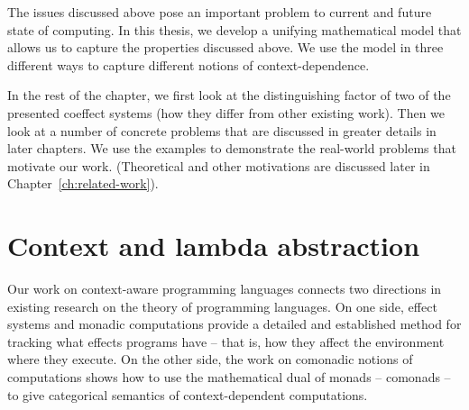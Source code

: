 The issues discussed above pose an important problem to current and future state of computing.
In this thesis, we develop a unifying mathematical model that allows us to capture the properties
discussed above. We use the model in three different ways to capture different notions of 
context-dependence.

In the rest of the chapter, we first look at the distinguishing factor of two of the presented
coeffect systems (how they differ from other existing work). Then we look at a number of concrete 
problems that are discussed in greater details in later chapters. We use the examples to demonstrate 
the real-world problems that motivate our work. (Theoretical and other motivations are discussed 
later in Chapter~\ref{ch:related-work}).


\section{Context and lambda abstraction}

Our work on context-aware programming languages connects two directions in existing research on the 
theory of programming languages. On one side, effect systems \cite{effects-gifford} and monadic 
computations \cite{monad-notions,monads-effects-marriage} provide a detailed and established method 
for tracking what effects programs have -- that is, how they affect the environment where they execute. 
On the other side, the work on comonadic notions of computations \cite{comonads-notions} shows how 
to use the mathematical dual of monads -- comonads -- to give categorical semantics of 
context-dependent computations.

